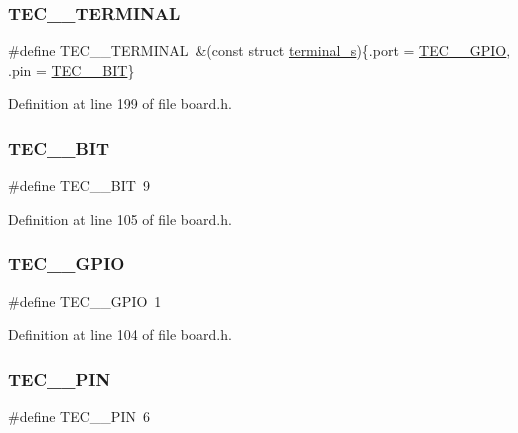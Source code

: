 \subsubsection{\texorpdfstring{T\+E\+C\+\_\+\_\+\+T\+E\+R\+M\+I\+N\+AL}{TEC\_3\_TERMINAL}}
{\footnotesize\ttfamily \#define T\+E\+C\+\_\+\_\+\+T\+E\+R\+M\+I\+N\+AL~\&(const struct \hyperlink{structterminal__s}{terminal\+\_\+s})\{.port = \hyperlink{group__samples_gae8728c8f2e4279383925ff93a183b407}{T\+E\+C\+\_\+\_\+\+G\+P\+IO}, .pin = \hyperlink{group__samples_ga64392cf03fba776f8a9dc238e25ec184}{T\+E\+C\+\_\+\_\+\+B\+IT}\}}



Definition at line 199 of file board.\+h.

\mbox{\label{group__hal_gac7c8a49f0602d0aeee33923ce8708a4b}} 
\subsubsection{\texorpdfstring{T\+E\+C\+\_\+\_\+\+B\+IT}{TEC\_4\_BIT}}
{\footnotesize\ttfamily \#define T\+E\+C\+\_\+\_\+\+B\+IT~9}



Definition at line 105 of file board.\+h.

\mbox{\label{group__hal_gaa5418f15596d7ada110c4105aa70e561}} 
\subsubsection{\texorpdfstring{T\+E\+C\+\_\+\_\+\+G\+P\+IO}{TEC\_4\_GPIO}}
{\footnotesize\ttfamily \#define T\+E\+C\+\_\+\_\+\+G\+P\+IO~1}



Definition at line 104 of file board.\+h.

\mbox{\label{group__hal_ga0b2447cd531de479b88f58f819566522}} 
\subsubsection{\texorpdfstring{T\+E\+C\+\_\+\_\+\+P\+IN}{TEC\_4\_PIN}}
{\footnotesize\ttfamily \#define T\+E\+C\+\_\+\_\+\+P\+IN~6}




